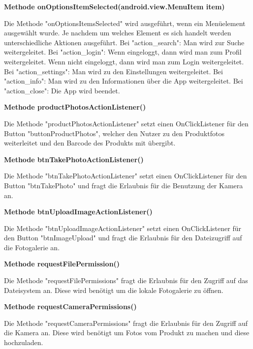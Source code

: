 \documentclass{scrartcl}
\begin{document}
\noindent\textbf{Methode onOptionsItemSelected(android.view.MenuItem item)} 

\noindent Die Methode "onOptionsItemsSelected" wird ausgeführt, wenn ein Menüelement ausgewählt wurde. Je nachdem um welches Element es sich handelt werden unterschiedliche Aktionen ausgeführt. Bei "action\_search": Man wird zur Suche weitergeleitet. Bei "action\_login": Wenn eingeloggt, dann wird man zum Profil weitergeleitet. Wenn nicht eingeloggt, dann wird man zum Login weitergeleitet. Bei "action\_settings": Man wird zu den Einstellungen weitergeleitet. Bei "action\_info": Man wird zu den Informationen über die App weitergeleitet. Bei "action\_close": Die App wird beendet. \newline

\noindent\textbf{Methode productPhotosActionListener()} 

\noindent Die Methode "productPhotosActionListener" setzt einen OnClickListener für den Button "buttonProductPhotos", welcher den Nutzer zu den Produktfotos weiterleitet und den Barcode des Produkts mit übergibt. \newline

\noindent\textbf{Methode btnTakePhotoActionListener()} 

\noindent Die Methode "btnTakePhotoActionListener" setzt einen OnClickListener für den Button "btnTakePhoto" und fragt die Erlaubnis für die Benutzung der Kamera an. \newline

\noindent\textbf{Methode btnUploadImageActionListener()} 

\noindent Die Methode "btnUploadImageActionListener" setzt einen OnClickListener für den Button "btnImageUpload" und fragt die Erlaubnis für den Dateizugriff auf die Fotogalerie an. \newline 

\noindent\textbf{Methode requestFilePermission()} 

\noindent Die Methode "requestFilePermissions" fragt die Erlaubnis für den Zugriff auf das Dateisystem an. Diese wird benötigt um die lokale Fotogalerie zu öffnen. \newline

\noindent\textbf{Methode requestCameraPermissions()} 

\noindent Die Methode "requestCameraPermissions" fragt die Erlaubnis für den Zugriff auf die Kamera an. Diese wird benötigt um Fotos vom Produkt zu machen und diese hochzuladen. \newline 
\end{document}

